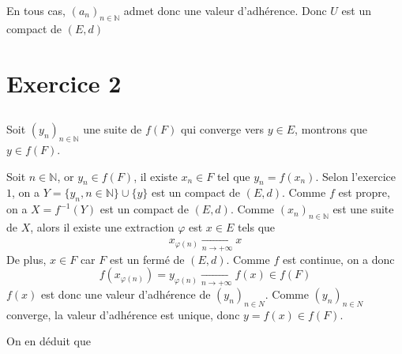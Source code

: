 \documentclass[a4paper,12pt]{book}
\begin{document}
En tous cas, $(a_n)_{n \in \mathbb{N}}$ admet donc une valeur d'adhérence. Donc $U$ est un compact de $(E,d)$
\section{Exercice 2}
\subsection{}
Soit $(y_n)_{n \in \mathbb{N}}$ une suite de $f(F)$ qui converge vers $y \in E$, montrons que $y \in f(F)$. 

Soit $n \in \mathbb{N}$, or $y_n \in f(F)$, il existe $x_n \in F$ tel que $y_n=f(x_n)$. Selon l'exercice $1$, on a 
$Y=\{y_n,n \in \mathbb{N}\}\cup \{y\}$ est un compact de $(E,d)$. Comme $f$ est propre, on a $X=f^{-1}(Y)$ est un compact de $(E,d)$. Comme 
$(x_n)_{n \in \mathbb{N}}$ est une suite de $X$, alors il existe une extraction $\varphi$ est $x \in E$ tels que 
$$
x_{\varphi(n)}\xrightarrow[n \to +\infty]{}x
$$
De plus, $x \in F$ car $F$ est un fermé de $(E,d)$. Comme $f$ est continue, on a donc 
$$
f(x_{\varphi(n)})=y_{\varphi(n)}\xrightarrow[n \to +\infty]{}f(x) \in f(F)
$$ 
$f(x)$ est donc une valeur d'adhérence de $(y_n)_{n \in N}$. Comme $(y_n)_{n \in N}$ converge, la valeur d'adhérence est unique, donc $y=f(x)\in f(F) $. 

On en déduit que 
\end{document}
